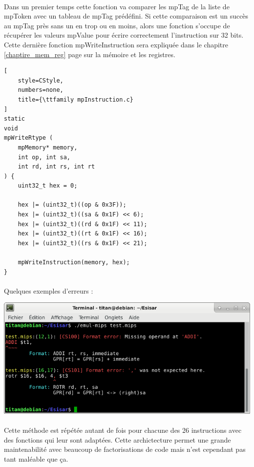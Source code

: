 \documentclass[12pt]{report} %
\begin{document}
\paragraph{}
Dans un premier temps cette fonction va comparer les {\ttfamily mpTag} de la liste de  {\ttfamily mpToken} avec un tableau de {\ttfamily mpTag} prédéfini. Si cette comparaison est un succès au {\ttfamily mpTag} près sans un en trop ou en moins, alors une fonction s'occupe de récupérer les valeurs {\ttfamily mpValue} pour écrire correctement l'instruction sur 32 bits. Cette dernière fonction {\ttfamily mpWriteInstruction} sera expliquée dans le chapitre \ref{chaptire_mem_reg} page \pageref{chaptire_mem_reg} sur la mémoire et les registres.

\begin{lstlisting}[
    style=CStyle,
    numbers=none,
    title={\ttfamily mpInstruction.c}
]
static
void
mpWriteRtype (
    mpMemory* memory,
    int op, int sa,
    int rd, int rs, int rt
) {
    uint32_t hex = 0;

    hex |= (uint32_t)((op & 0x3F));
    hex |= (uint32_t)((sa & 0x1F) << 6);
    hex |= (uint32_t)((rd & 0x1F) << 11);
    hex |= (uint32_t)((rt & 0x1F) << 16);
    hex |= (uint32_t)((rs & 0x1F) << 21);

    mpWriteInstruction(memory, hex);
}
\end{lstlisting}

\paragraph{}
Quelques exemples d'erreurs :

\begin{center}
    \includegraphics[width=\textwidth]{MIPS-mpInstruction.png}
\end{center}

\paragraph{}
Cette méthode est répétée autant de fois pour chacune des 26 instructions avec des fonctions qui leur sont adaptées. Cette archictecture permet une grande maintenabilité avec beaucoup de factorisations de code mais n'est cependant pas tant maléable que ça.
\end{document}
